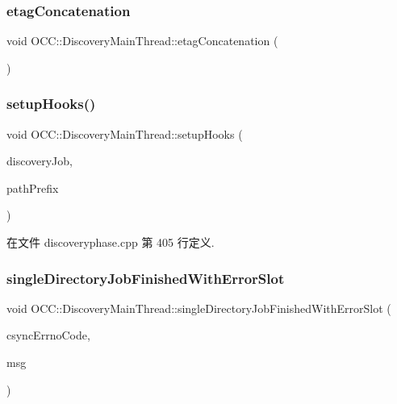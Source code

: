 \subsubsection{\texorpdfstring{etag\+Concatenation}{etagConcatenation}}
{\footnotesize\ttfamily void O\+C\+C\+::\+Discovery\+Main\+Thread\+::etag\+Concatenation (\begin{DoxyParamCaption}\item[{const Q\+String \&}]{ }\end{DoxyParamCaption})\hspace{0.3cm}{\ttfamily [signal]}}

\mbox{\label{class_o_c_c_1_1_discovery_main_thread_a3376415f6029953ceb4c4c6259f92274}} 
\subsubsection{\texorpdfstring{setup\+Hooks()}{setupHooks()}}
{\footnotesize\ttfamily void O\+C\+C\+::\+Discovery\+Main\+Thread\+::setup\+Hooks (\begin{DoxyParamCaption}\item[{\hyperlink{class_o_c_c_1_1_discovery_job}{Discovery\+Job} $\ast$}]{discovery\+Job,  }\item[{const Q\+String \&}]{path\+Prefix }\end{DoxyParamCaption})}



在文件 discoveryphase.\+cpp 第 405 行定义.

\mbox{\label{class_o_c_c_1_1_discovery_main_thread_aa0d2712a1f7bf9da44cfe285b0f2a402}} 
\subsubsection{\texorpdfstring{single\+Directory\+Job\+Finished\+With\+Error\+Slot}{singleDirectoryJobFinishedWithErrorSlot}}
{\footnotesize\ttfamily void O\+C\+C\+::\+Discovery\+Main\+Thread\+::single\+Directory\+Job\+Finished\+With\+Error\+Slot (\begin{DoxyParamCaption}\item[{int}]{csync\+Errno\+Code,  }\item[{const Q\+String \&}]{msg }\end{DoxyParamCaption})\hspace{0.3cm}{\ttfamily [slot]}}



